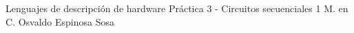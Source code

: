 




	\pnormal
	{Lenguajes de descripción de hardware}
	{Práctica 3  - Circuitos secuenciales 1}
	{M. en C. Osvaldo Espinosa Sosa}
	\tableofcontents
	
	\newpage   
	\newpage   
	\clearpage 
	\clearpage 
	\clearpage 
	\clearpage 
	\newpage   



